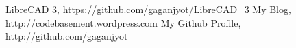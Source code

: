 \begin{thebibliography}{9}
\bibitem{} LibreCAD 3, https://github.com/gaganjyot/LibreCAD\_3
\bibitem{} My Blog, http://codebasement.wordpress.com
\bibitem{} My Github Profile, http://github.com/gaganjyot
\end{thebibliography}
